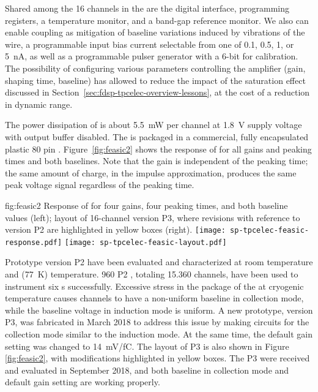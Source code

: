 Shared among the \num{16} channels in the   are 
the digital interface, programming registers, a temperature monitor, 
and a band-gap reference monitor. We also can enable  
coupling as mitigation of baseline variations induced by vibrations
of the  wire, a programmable input bias current 
selectable from one of \num{0.1}, \num{0.5}, \num{1}, or \SI{5}{nA}, 
as well as a programmable pulser generator with a \num{6}-bit 
 for calibration. The possibility of configuring various
parameters controlling the  amplifier (gain, shaping time,
baseline) has allowed  to reduce the impact of the
saturation effect discussed in Section~\ref{sec:fdsp-tpcelec-overview-lessons}, 
at the cost of a reduction in dynamic range.

The power dissipation of   is about \SI{5.5}{mW} 
per channel at \SI{1.8}{V} supply voltage with output buffer disabled. 
The  is packaged in a commercial, fully encapsulated 
plastic \num{80} pin . Figure~\ref{fig:feasic2} shows the 
response of   for all gains and peaking times 
and both baselines. Note that the gain is independent of the peaking 
time; the same amount of charge, in the impulse approximation, produces 
the same peak voltage signal regardless of the peaking time.

\begin{dunefigure}
{fig:feasic2}
{Response of   for four gains, four peaking times, 
and both baseline values (left); layout of \num{16}-channel  
 version P3, where revisions with reference to version 
P2 are highlighted in yellow boxes (right).}
\texttt{[image: sp-tpcelec-feasic-response.pdf]}
\hspace{6mm}
\texttt{[image: sp-tpcelec-feasic-layout.pdf]}
\end{dunefigure}

Prototype version P2   have been evaluated and 
characterized at room temperature and \lntwo (\SI{77}{K}) temperature. 
\num{960} P2  , totaling \num{15,360} channels, 
have been used to instrument six  s successfully. 
Excessive stress in the package of the   at cryogenic 
temperature causes  channels to have a non-uniform baseline in 
collection mode, while the baseline  voltage in induction mode 
is uniform. A new prototype, version P3, was fabricated in March 2018 
to address this issue by making  circuits for the collection mode 
similar to the induction mode. At the same time, the default gain
setting was changed to \SI{14}{mV/fC}. The layout of P3  
 is also shown in Figure \ref{fig:feasic2}, with modifications 
highlighted in yellow boxes. The P3   were 
received and evaluated in September 2018, and both baseline in collection 
mode and default gain setting are working properly.

